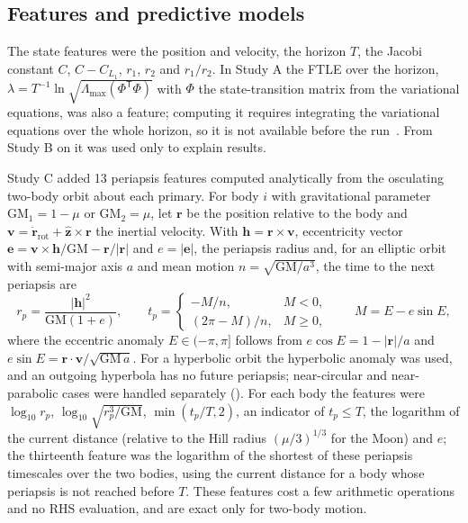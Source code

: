 \documentclass[10pt,letterpaper]{article}
\begin{document}
\subsection*{Features and predictive models}
The state features were the position and velocity, the horizon $T$, the Jacobi constant $C$, $C - C_{L_1}$, $r_{1}$, $r_{2}$ and $r_{1}/r_{2}$. In Study A the FTLE over the horizon, $\lambda = T^{-1}\ln\sqrt{\Lambda_{\max}(\Phi^{\mathsf{T}}\Phi)}$ with $\Phi$ the state-transition matrix from the variational equations, was also a feature; computing it requires integrating the variational equations over the whole horizon, so it is not available before the run~\cite{shadden2005,gawlik2009}. From Study B on it was used only to explain results.

Study C added 13 periapsis features computed analytically from the osculating two-body orbit about each primary. For body $i$ with gravitational parameter $\mathrm{GM}_{1} = 1-\mu$ or $\mathrm{GM}_{2} = \mu$, let $\boldsymbol{r}$ be the position relative to the body and $\boldsymbol{v} = \dot{\boldsymbol{r}}_{\mathrm{rot}} + \hat{\boldsymbol{z}}\times\boldsymbol{r}$ the inertial velocity. With $\boldsymbol{h} = \boldsymbol{r}\times\boldsymbol{v}$, eccentricity vector $\boldsymbol{e} = \boldsymbol{v}\times\boldsymbol{h}/\mathrm{GM} - \boldsymbol{r}/|\boldsymbol{r}|$ and $e = |\boldsymbol{e}|$, the periapsis radius and, for an elliptic orbit with semi-major axis $a$ and mean motion $n = \sqrt{\mathrm{GM}/a^{3}}$, the time to the next periapsis are
\begin{equation}
\label{eq:peri}
r_{p} = \frac{|\boldsymbol{h}|^{2}}{\mathrm{GM}(1+e)}, \qquad
t_{p} =
\begin{cases}
-M/n, & M < 0,\\
(2\pi - M)/n, & M \ge 0,
\end{cases}
\qquad
M = E - e\sin E,
\end{equation}
where the eccentric anomaly $E \in (-\pi,\pi]$ follows from $e\cos E = 1 - |\boldsymbol{r}|/a$ and $e\sin E = \boldsymbol{r}\cdot\boldsymbol{v}/\sqrt{\mathrm{GM}\,a}$. For a hyperbolic orbit the hyperbolic anomaly was used, and an outgoing hyperbola has no future periapsis; near-circular and near-parabolic cases were handled separately (). For each body the features were $\log_{10} r_{p}$, $\log_{10}\sqrt{r_{p}^{3}/\mathrm{GM}}$, $\min(t_{p}/T, 2)$, an indicator of $t_{p} \le T$, the logarithm of the current distance (relative to the Hill radius $(\mu/3)^{1/3}$ for the Moon) and $e$; the thirteenth feature was the logarithm of the shortest of these periapsis timescales over the two bodies, using the current distance for a body whose periapsis is not reached before $T$. These features cost a few arithmetic operations and no RHS evaluation, and are exact only for two-body motion.
\end{document}

